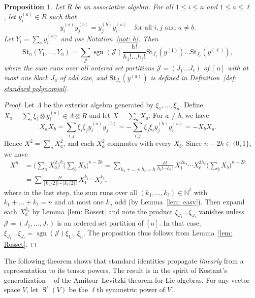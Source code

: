 \documentclass[12pt]{amsart}
\theoremstyle{plain}
\newtheorem{proposition}[theorem]{Proposition}
\theoremstyle{definition}
\numberwithin{equation}{theorem}
\newcommand{\Sa}{\operatorname{S}}
\newcommand{\sgn}{\operatorname{sgn}}
\newcommand{\NN}{\mathbb{N}}
\newcommand{\mc}[1]{\mathcal{#1}}
\newcommand{\St}{\mathrm{St}}
\begin{document}
\begin{proposition}\label{prop: Rosset split}
    Let $R$ be an associative algebra. For all $1 \leq i \leq n$ and $1 \leq a \leq \ell$, let $y_i^{(a)} \in R$ such that 
    \[ y_i^{(a)} y_j^{(b)} = y_j^{(b)} y_i^{(a)} \quad \text{for all }i, j \text{ and } a \neq b.\]
    Let $Y_i = \sum_{a} y_i^{(a)}$ and use Notation~\ref{not: h}. Then
    \begin{equation}\label{eq: Rosset split eq}
        \St_n(Y_1, \dots, Y_n) = \sum_{\mc{J}} \sgn(\mc{J}) \frac{h!}{h_1! \dots h_\ell!}  \St_{J_1} (y^{(1)}) \dots \St_{J_\ell}(y^{(\ell)}),
    \end{equation}
    where the sum runs over all ordered set partitions $\mc{J}=(J_1 \dots J_\ell)$ of $[n]$ with at most one block $J_a$ of odd size, and $\St_{J_a}(y^{(a)})$ is defined in Definition~\ref{def: standard polynomial}.
\end{proposition}
\begin{proof}
    Let $\Lambda$ be the exterior algebra generated by $\xi_1, \dots, \xi_n$. Define $X_a = \sum_{i} \xi_i \otimes y_i^{(a)} \in \Lambda \otimes R$ and let $X = \sum_a X_a$. For $a \neq b$, we have 
    \[X_a X_b = \sum_{i, j} \xi_i \xi_j y_i^{(a)} y_j^{(b)} = -  \sum_{i, j} \xi_j \xi_i y_j^{(b)} y_i^{(a)} = -X_b X_a.\]
    Hence $X^2 = \sum_a X_a^2$, and each $X_a^2$ commutes with every $X_b$. Since $n - 2h \in \{0, 1\}$, we have
    \begin{align*}
        X^n &= \Big( \sum_a X_a^2 \Big)^{h} \Big( \sum_b X_b \Big)^{n-2h} = \sum_{h_1 + \dots + h_\ell = h} \frac{h!}{h_1! \cdots h_\ell!} \, X_1^{2h_1} \cdots X_\ell^{2h_\ell} \Big( \sum_b X_b \Big)^{n-2h} \\
            &= \sum
               \frac{h!}{\lfloor k_1/2 \rfloor! \cdots \lfloor k_\ell/2 \rfloor!}\,
               X_1^{k_1} \cdots X_\ell^{k_\ell},
    \end{align*}
    where in the last step, the sum runs over all $(k_1, \dots, k_\ell) \in \NN^\ell$ with $k_1 + \dots + k_\ell = n$ and at most one $k_a$ odd (by Lemma~\ref{lem: easy}). Then expand each $X^{k_a}_a$ by Lemma~\ref{lem: Rosset} and note the product $\xi_{J_1} \dots \xi_{J_\ell}$ vanishes unless $\mc{J} = (J_1, \dots, J_\ell)$ is an ordered set partition of $[n]$. In that case, $\xi_{J_1} \dots \xi_{J_\ell} = \sgn(\mc{J}) \xi_1 \dots \xi_n$. The proposition thus follows from Lemma~\ref{lem: Rosset}.
\end{proof}

The following theorem shows that standard identities propagate \emph{linearly} from a representation to its tensor powers. The result is in the spirit of Kostant's generalization ~\cite{Kostant81} of the Amitsur--Levitzki theorem for Lie algebras. For any vector space $V$, let $\Sa^\ell(V)$ be the $\ell$th symmetric power of $V$. 
\end{document}
